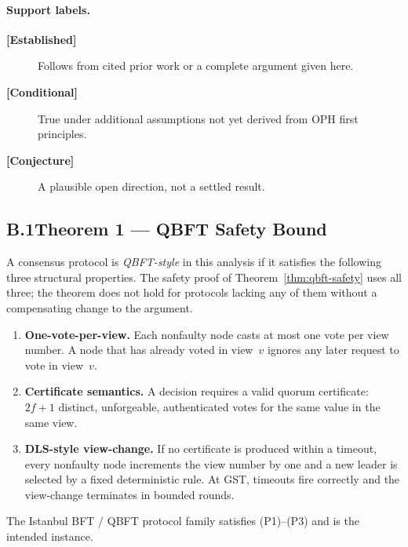 \paragraph{Support labels.}
\begin{description}
  \item[\textbf{[Established]}] Follows from cited prior work or a complete
        argument given here.
  \item[\textbf{[Conditional]}] True under additional assumptions not yet
        derived from \textrm{OPH} first principles.
  \item[\textbf{[Conjecture]}] A plausible open direction, not a settled result.
\end{description}

\subsection*{B.1\quad Theorem 1 --- QBFT Safety Bound}

\begin{definition}
\label{def:qbft-style}
A consensus protocol is \emph{QBFT-style} in this analysis if it satisfies
the following three structural properties.
The safety proof of Theorem~\ref{thm:qbft-safety} uses all three;
the theorem does not hold for protocols lacking any of them without a
compensating change to the argument.
\begin{enumerate}[(P1)]
  \item \textbf{One-vote-per-view.}
        Each nonfaulty node casts at most one vote per view number.
        A node that has already voted in view~$v$ ignores any later request
        to vote in view~$v$.
  \item \textbf{Certificate semantics.}
        A decision requires a valid quorum certificate: $2f+1$ distinct,
        unforgeable, authenticated votes for the same value in the same view.
  \item \textbf{DLS-style view-change.}
        If no certificate is produced within a timeout, every nonfaulty node
        increments the view number by one and a new leader is selected by a
        fixed deterministic rule.  At \textrm{GST}, timeouts fire correctly
        and the view-change terminates in bounded rounds.
\end{enumerate}
The Istanbul BFT / QBFT protocol family
\cite{Moniz2020,Saltini}
satisfies (P1)--(P3) and is the intended instance.
\end{definition}

